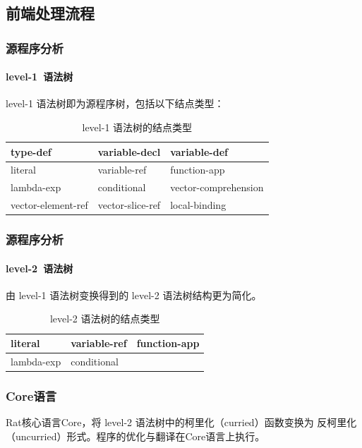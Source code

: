 \documentclass{beamer}
\begin{document}
\subsection{前端处理流程}
\begin{frame}
  \frametitle{源程序分析}
  \framesubtitle{level-1~语法树}
  level-1 语法树即为源程序树，包括以下结点类型：
  \begin{table}
    \caption{level-1 语法树的结点类型}
    \begin{tabular}{|l|l|l|}
      \hline
      type-def & variable-decl & variable-def\\
      \hline
      literal & variable-ref & function-app\\
      \hline
      lambda-exp & conditional & vector-comprehension\\
      \hline
      vector-element-ref & vector-slice-ref & local-binding\\
      \hline
    \end{tabular}
  \end{table}
\end{frame}

\begin{frame}
  \frametitle{源程序分析}
  \framesubtitle{level-2~语法树}
  由 level-1 语法树变换得到的 level-2 语法树结构更为简化。
  \begin{table}
    \caption{level-2 语法树的结点类型}
    \begin{tabular}{|l|l|l|}
      \hline
      literal & variable-ref & function-app\\
      \hline
      lambda-exp & conditional &\\
      \hline
    \end{tabular}
  \end{table}
\end{frame}

\begin{frame}
  \frametitle{Core语言}
  Rat核心语言Core，将 level-2 语法树中的柯里化（curried）函数变换为
  反柯里化（uncurried）形式。程序的优化与翻译在Core语言上执行。
\end{frame}
\end{document}
